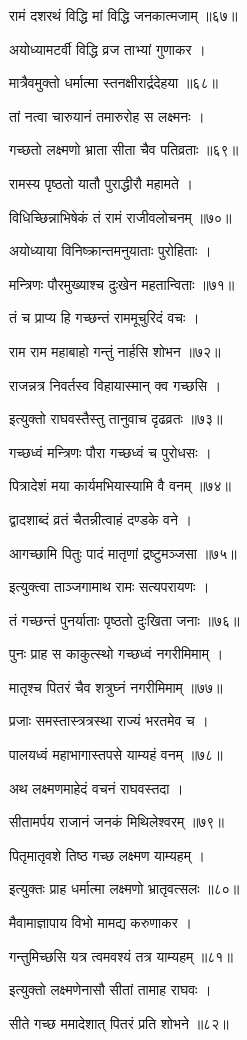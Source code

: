 रामं दशरथं विद्धि मां विद्धि जनकात्मजाम् ॥६७॥

अयोध्यामटर्वी विद्धि व्रज ताभ्यां गुणाकर ।

मात्रैवमुक्तो धर्मात्मा स्तनक्षीरार्द्रदेहया ॥६८॥

तां नत्वा चारुयानं तमारुरोह स लक्ष्मनः ।

गच्छतो लक्ष्मणो भ्राता सीता चैव पतिव्रताः ॥६९॥

रामस्य पृष्ठतो यातौ पुराद्धीरौ महामते ।

विधिच्छिन्नाभिषेकं तं रामं राजीवलोचनम् ॥७०॥

अयोध्याया विनिष्क्रान्तमनुयाताः पुरोहिताः ।

मन्त्रिणः पौरमुख्याश्च दुःखेन महतान्विताः ॥७१॥

तं च प्राप्य हि गच्छन्तं राममूचुरिदं वचः ।

राम राम महाबाहो गन्तुं नार्हसि शोभन ॥७२॥

राजन्नत्र निवर्तस्व विहायास्मान् क्व गच्छसि ।

इत्युक्तो राघवस्तैस्तु तानुवाच दृढव्रतः ॥७३॥

गच्छध्वं मन्त्रिणः पौरा गच्छध्वं च पुरोधसः ।

पित्रादेशं मया कार्यमभियास्यामि वै वनम् ॥७४॥

द्वादशाब्दं व्रतं चैतन्नीत्वाहं दण्डके वने ।

आगच्छामि पितुः पादं मातृणां द्रष्टुमञ्जसा ॥७५॥

इत्युक्त्वा ताञ्जगामाथ रामः सत्यपरायणः ।

तं गच्छन्तं पुनर्याताः पृष्ठतो दुःखिता जनाः ॥७६॥

पुनः प्राह स काकुत्स्थो गच्छध्वं नगरीमिमाम् ।

मातृश्च पितरं चैव शत्रुघ्नं नगरीमिमाम् ॥७७॥

प्रजाः समस्तास्त्रत्रस्था राज्यं भरतमेव च ।

पालयध्वं महाभागास्तपसे याम्यहं वनम् ॥७८॥

अथ लक्ष्मणमाहेदं वचनं राघवस्तदा ।

सीतामर्पय राजानं जनकं मिथिलेश्वरम् ॥७९॥

पितृमातृवशे तिष्ठ गच्छ लक्ष्मण याम्यहम् ।

इत्युक्तः प्राह धर्मात्मा लक्ष्मणो भ्रातृवत्सलः ॥८०॥

मैवामाज्ञापाय विभो मामद्य करुणाकर ।

गन्तुमिच्छसि यत्र त्वमवश्यं तत्र याम्यहम् ॥८१॥

इत्युक्तो लक्ष्मणेनासौ सीतां तामाह राघवः ।

सीते गच्छ ममादेशात् पितरं प्रति शोभने ॥८२॥

